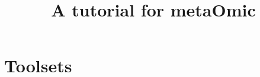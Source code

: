 \documentclass{article}
\title{A tutorial for metaOmic}
\author{}
\date{ }
\begin{document}
 
\maketitle
 
\tableofcontents
 
 
 
 
 
\section{Toolsets}
 
 
 
 
 
 
% 
% 



 
\end{document}

